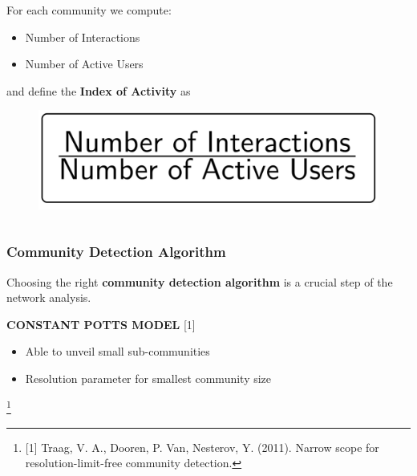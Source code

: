 \documentclass{beamer}
\newcommand\blfootnote[1]{%
  \begingroup
  \renewcommand\thefootnote{}\footnote{#1}%
  \addtocounter{footnote}{-1}%
  \endgroup
}
\begin{document}
\begin{frame}
\begin{columns}
	\begin{column}{0.6\textwidth}
		For each community we compute:
		\vspace{0.3cm}
		\begin{itemize}
			\item Number of Interactions 
			\item Number of Active Users
		\end{itemize}
		\vspace{0.3cm}
		and define the \textbf{Index of Activity} as
		\begin{figure}
			\centering
			\includegraphics[width=0.85\linewidth]{figures/index}
		\end{figure}

	\end{column}
	
\end{columns}
\end{frame}


\begin{frame}
\frametitle{Community Detection Algorithm}
Choosing the right \textbf{community detection algorithm} is a crucial step of the network analysis. 
\vspace{0.5cm}

{
\centering 
\begin{tcolorbox}[width=8cm, colframe=black, colback=white, halign=center]
\textbf{CONSTANT POTTS MODEL} \small [1]
\end{tcolorbox}
}
\begin{itemize}
	\centering
	\item Able to unveil small sub-communities
	\centering
	\item Resolution parameter for smallest community size
\end{itemize}

\blfootnote{\small [1] Traag, V. A., Dooren, P. Van, Nesterov, Y. (2011). Narrow scope for resolution-limit-free community detection.}
\end{frame}

\end{document}
